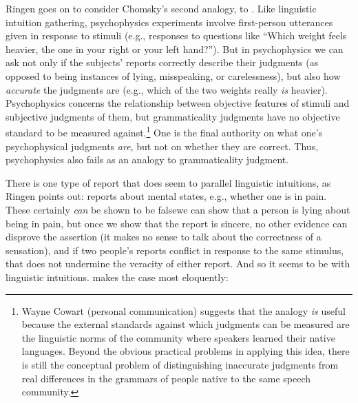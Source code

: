 Ringen goes on to consider Chomsky's second analogy, to . Like linguistic intuition gathering, psychophysics experiments involve first-person utterances given in response to stimuli (e.g., responses to questions like ``Which weight feels heavier, the one in your right or your left hand?''). But in psychophysics we can ask not only if the subjects' reports correctly describe their judgments (as opposed to being instances of lying, misspeaking, or carelessness), but also how \textit{accurate} the judgments are (e.g., which of the two weights really \textit{is} heavier). Psychophysics concerns the relationship between objective features of stimuli and subjective judgments of them, but grammaticality judgments have no objective standard to be measured against.\footnote{Wayne Cowart (personal communication) suggests that the analogy \textit{is} useful because the external standards against which judgments can be measured are the linguistic norms of the community where speakers learned their native languages. Beyond the obvious practical problems in applying this idea, there is still the conceptual problem of distinguishing inaccurate judgments from real differences in the grammars of people native to the same speech community.
}
 One is the final authority on what one's psychophysical judgments \textit{are}, but not on whether they are correct. Thus, psychophysics also fails as an analogy to grammaticality judgment.

There is one type of report that does seem to parallel linguistic intuitions, as Ringen points out: reports about mental states, e.g., whether one is in pain. These certainly \textit{can} be shown to be false\schdash{}we can show that a person is lying about being in pain, but once we show that the report is sincere, no other evidence can
\enlargethispage{\baselineskip}
disprove the assertion (it makes no sense to talk about the correctness of a sensation), and if two people's reports conflict in response to the same stimulus, that does not undermine the veracity of either report. And so it seems to be with linguistic intuitions. \citet{Pateman1987} makes the case most eloquently:

